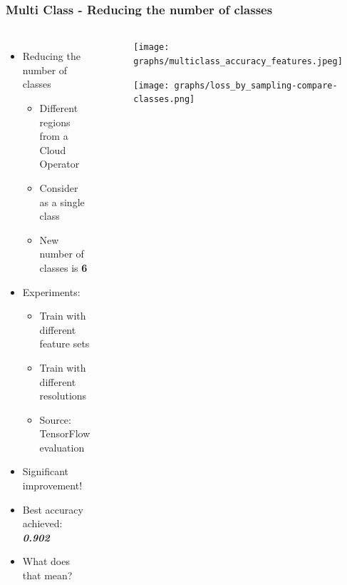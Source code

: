 \documentclass[aspectratio=169,11pt,hyperref={colorlinks=true}]{beamer}
\begin{document}
\begin{frame}
    \frametitle{Multi Class - Reducing the number of classes}
    \begin{columns}
        \begin{itemize}
            \item{Reducing the number of classes}
            \begin{itemize}
                \item{Different regions from a Cloud Operator}
                \item{Consider as a single class}
                \item{New number of classes is \textbf{6}}
            \end{itemize}
            \item{Experiments:}
              \begin{itemize}
                \item{Train with different feature sets}
                \item{Train with different resolutions}
                \item{Source: TensorFlow evaluation}
            \end{itemize}
            \item{Significant improvement!}
            \item{Best accuracy achieved: \emph{\textbf{0.902}}}
            \item{What does that mean?}
        \end{itemize}
        \begin{center}
        \begin{figure}
          \texttt{[image: graphs/multiclass\_accuracy\_features.jpeg]}
        \end{figure}
        \begin{figure}
          \texttt{[image: graphs/loss\_by\_sampling-compare-classes.png]}
        \end{figure}
        \end{center}
  \end{columns}
\end{frame}
\end{document}
